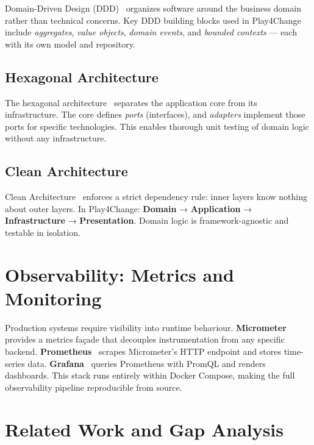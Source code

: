 Domain-Driven Design (DDD)~\cite{evans2003domain} organizes software around the business domain rather than technical concerns. Key DDD building blocks used in Play4Change include \emph{aggregates}, \emph{value objects}, \emph{domain events}, and \emph{bounded contexts} — each with its own model and repository.

\subsection{Hexagonal Architecture}
\label{ssec:hexagonal}

The hexagonal architecture~\cite{cockburn2005hexagonal} separates the application core from its infrastructure. The core defines \emph{ports} (interfaces), and \emph{adapters} implement those ports for specific technologies. This enables thorough unit testing of domain logic without any infrastructure.

\subsection{Clean Architecture}
\label{ssec:clean}

Clean Architecture~\cite{martin2017clean} enforces a strict dependency rule: inner layers know nothing about outer layers. In Play4Change: \textbf{Domain} → \textbf{Application} → \textbf{Infrastructure} → \textbf{Presentation}. Domain logic is framework-agnostic and testable in isolation.

\section{Observability: Metrics and Monitoring}
\label{sec:observability_bg}

Production systems require visibility into runtime behaviour. \textbf{Micrometer}~\cite{micrometer2024} provides a metrics façade that decouples instrumentation from any specific backend. \textbf{Prometheus}~\cite{prometheus2024} scrapes Micrometer's HTTP endpoint and stores time-series data. \textbf{Grafana}~\cite{grafana2024} queries Prometheus with PromQL and renders dashboards. This stack runs entirely within Docker Compose, making the full observability pipeline reproducible from source.

\section{Related Work and Gap Analysis}
\label{sec:related}

